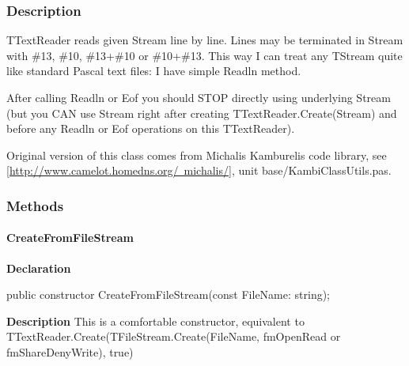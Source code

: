 \documentclass{report}
\newif\ifpdf
\begin{document}
\subsubsection*{\large{\textbf{Description}}\normalsize\hspace{1ex}\hfill}
TTextReader reads given Stream line by line. Lines may be terminated in Stream with {\#}13, {\#}10, {\#}13+{\#}10 or {\#}10+{\#}13. This way I can treat any TStream quite like standard Pascal text files: I have simple Readln method.

After calling Readln or Eof you should STOP directly using underlying Stream (but you CAN use Stream right after creating TTextReader.Create(Stream) and before any Readln or Eof operations on this TTextReader).

Original version of this class comes from Michalis Kamburelis code library, see [\href{http://www.camelot.homedns.org/~michalis/}{http://www.camelot.homedns.org/~michalis/}], unit base/KambiClassUtils.pas.\subsubsection*{\large{\textbf{Methods}}\normalsize\hspace{1ex}\hfill}
\paragraph*{CreateFromFileStream}\hspace*{\fill}

\label{PasDoc_ProcessLineTalk.TTextReader-CreateFromFileStream}
\begin{list}{}{
\setlength{\itemindent}{0cm}
\setlength{\listparindent}{0cm}
\setlength{\leftmargin}{\evensidemargin}
\addtolength{\leftmargin}{\tmplength}
\settowidth{\labelsep}{X}
\addtolength{\leftmargin}{\labelsep}
\setlength{\labelwidth}{\tmplength}
}
\item[\textbf{Declaration}\hfill]
\ifpdf
\begin{flushleft}
\fi
\begin{ttfamily}
public constructor CreateFromFileStream(const FileName: string);\end{ttfamily}

\ifpdf
\end{flushleft}
\fi

\par
\item[\textbf{Description}]
This is a comfortable constructor, equivalent to TTextReader.Create(TFileStream.Create(FileName, fmOpenRead or fmShareDenyWrite), true)

\end{list}
\end{document}
